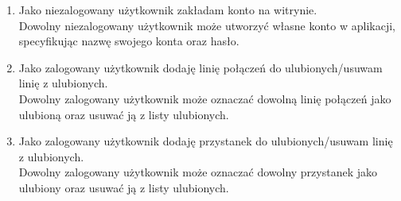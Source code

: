\documentclass[10pt,a4paper]{article}
\begin{document}
\begin{enumerate}
\begin{enumerate}[label*=\arabic*.]
\begin{enumerate}[label*=\arabic*.]
		 	\item Jako niezalogowany użytkownik zakładam konto na witrynie. \\
			    Dowolny niezalogowany użytkownik może utworzyć własne konto w aplikacji, specyfikując nazwę swojego konta oraz hasło.
		 	\item Jako zalogowany użytkownik dodaję linię połączeń do ulubionych/usuwam linię z ulubionych. \\
			    Dowolny zalogowany użytkownik może oznaczać dowolną linię połączeń jako ulubioną oraz usuwać ją z listy ulubionych.
		 	\item Jako zalogowany użytkownik dodaję przystanek do ulubionych/usuwam linię z ulubionych. \\
			    Dowolny zalogowany użytkownik może oznaczać dowolny przystanek jako ulubiony oraz usuwać ją z listy ulubionych.
		\end{enumerate}
	\end{enumerate}
\end{enumerate}
\end{document}
